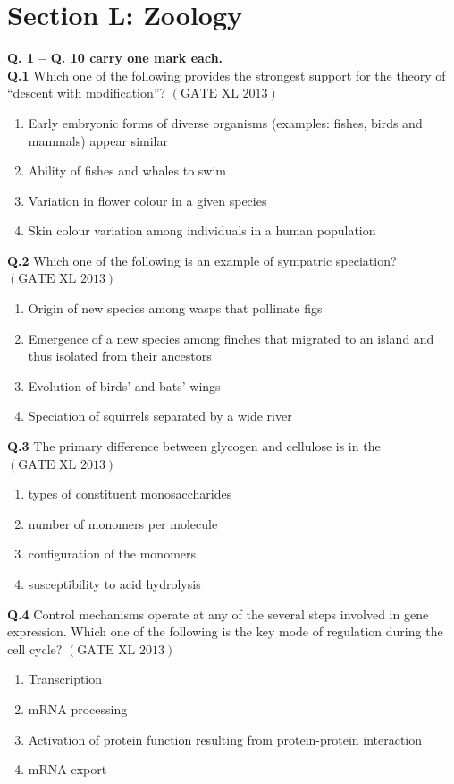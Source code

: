 \documentclass[12pt]{article}
\theoremstyle{remark}
\providecommand{\brak}[1]{\ensuremath{\left(#1\right)}}
\begin{document}
\section*{Section L: Zoology}

\noindent\textbf{Q. 1 – Q. 10 carry one mark each.}\\

\textbf{Q.1} Which one of the following provides the strongest support for the theory of “descent with modification”? \hfill $\brak{\text{GATE XL 2013}}$
\begin{enumerate}
    \item Early embryonic forms of diverse organisms (examples: fishes, birds and mammals) appear similar
    \item Ability of fishes and whales to swim
    \item Variation in flower colour in a given species
    \item Skin colour variation among individuals in a human population
\end{enumerate}

\textbf{Q.2} Which one of the following is an example of sympatric speciation? \hfill $\brak{\text{GATE XL 2013}}$
\begin{enumerate}
    \item Origin of new species among wasps that pollinate figs
    \item Emergence of a new species among finches that migrated to an island and thus isolated from their ancestors
    \item Evolution of birds’ and bats’ wings
    \item Speciation of squirrels separated by a wide river
\end{enumerate}

\textbf{Q.3} The primary difference between glycogen and cellulose is in the \hfill $\brak{\text{GATE XL 2013}}$
\begin{enumerate}
    \item types of constituent monosaccharides
    \item number of monomers per molecule
    \item configuration of the monomers
    \item susceptibility to acid hydrolysis
\end{enumerate}

\textbf{Q.4} Control mechanisms operate at any of the several steps involved in gene expression. Which one of the following is the key mode of regulation during the cell cycle? \hfill $\brak{\text{GATE XL 2013}}$
\begin{enumerate}
    \item Transcription
    \item mRNA processing
    \item Activation of protein function resulting from protein-protein interaction
    \item mRNA export
\end{enumerate}
\end{document}
